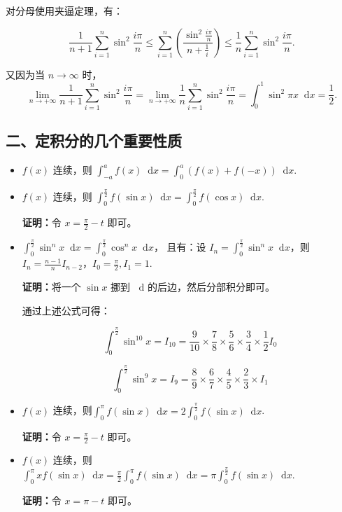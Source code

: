 \documentclass[b5paper]{ctexart}
\renewcommand{\d}{\mathop{}\!\mathrm{d}}
\begin{document}
	对分母使用夹逼定理，有：
	
	\begin{equation*}
		\frac{1}{n + 1} \sum_{i = 1}^{n} \sin ^2 \frac{i \pi}{n} \le \sum_{i = 1}^{n} (\frac{\sin ^2 \frac{i \pi}{n}}{n + \frac{1}{i}}) \le \frac{1}{n} \sum_{i = 1}^{n} \sin ^2 \frac{i \pi}{n}.
	\end{equation*}
	
	又因为当 $n \to \infty$ 时，
	\begin{equation*}
		\lim\limits_{n \to +\infty} \frac{1}{n + 1} \sum_{i = 1}^{n} \sin ^2 \frac{i \pi}{n} =\lim\limits_{n \to +\infty}  \frac{1}{n} \sum_{i = 1}^{n} \sin ^2 \frac{i \pi}{n} = \int_{0}^{1} \sin^2 \pi x \d x = \frac{1}{2}.
	\end{equation*}
	\subsection*{二、定积分的几个重要性质}
	
	\begin{itemize}
		\item $f(x)$ 连续，则 $\int_{-a}^{a} f(x) \d x = \int_{0}^{a} (f(x) + f(-x)) \d x$.
		
		\item $f(x)$ 连续，则 $\int_{0}^{\frac{\pi}{2}} f(\sin x) \d x = \int_{0}^{\frac{\pi}{2}} f(\cos x) \d x$.
		
		\textbf{证明：}令 $x = \frac{\pi}{2} - t$ 即可。
		\item $\int_{0}^{\frac{\pi}{2}} \sin^n x \d x = \int_{0}^{\frac{\pi}{2}} \cos^n x \d x$，
		且有：设 $I_n = \int_{0}^{\frac{\pi}{2}} \sin^n x \d x$，则 $I_n = \frac{n - 1}{n} I_{n - 2}$，$I_0 = \frac{\pi}{2}, I_1 = 1$.\
		
		\textbf{证明：}将一个 $\sin x$ 挪到 $\d$ 的后边，然后分部积分即可。
		
		通过上述公式可得：
		
		\begin{equation*}
			\int_{0}^{\frac{\pi}{2}} \sin^{10} x =  I_{10} = \frac{9}{10}\times \frac{7}{8}\times \frac{5}{6}\times \frac{3}{4}\times \frac{1}{2} I_0  
		\end{equation*}
		
		\begin{equation*}
			\int_{0}^{\frac{\pi}{2}} \sin^{9} x =  I_{9} = \frac{8}{9}\times \frac{6}{7}\times \frac{4}{5}\times \frac{2}{3}\times I_1
		\end{equation*}
		
		\item $f(x)$ 连续，则$\int_{0}^{\pi} f(\sin x) \d x = 2 \int_{0}^{\frac{\pi}{2}} f(\sin x) \d x $.
		
		\textbf{证明：}令 $x = \frac{\pi}{2} - t$ 即可。
		
		\item $f(x)$ 连续，则$\int_{0}^{\pi} x f(\sin x) \d x= \frac{\pi}{2} \int_{0}^{\pi}  f(\sin x) \d x = \pi \int_{0}^{\frac{\pi}{2}}  f(\sin x) \d x$.
		
		\textbf{证明：}令 $x = \pi - t$ 即可。
		
	\end{itemize}
	
\end{document}
